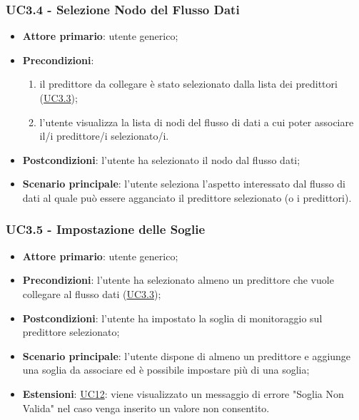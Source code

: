 	\label{par:UC3.4}
	\subsubsection{UC3.4 - Selezione Nodo del Flusso Dati}
		\begin{itemize}
			\item\textbf{Attore primario}: utente generico;
			\item\textbf{Precondizioni}:
				\begin{enumerate}
					\item il predittore da collegare è stato selezionato dalla lista dei predittori (\hyperref[par:UC3.3]{UC3.3});
					\item l’utente visualizza la lista di nodi del flusso di dati a cui poter associare il/i predittore/i selezionato/i.
				\end{enumerate}
			\item\textbf{Postcondizioni}: l'utente ha selezionato il nodo dal flusso dati;
			\item\textbf{Scenario principale}: l’utente seleziona l’aspetto interessato dal flusso di dati al quale può essere agganciato il predittore selezionato (o i predittori).
		\end{itemize}

	\label{par:UC3.5}
	\subsubsection{UC3.5 - Impostazione delle Soglie}
		\begin{itemize}
			\item\textbf{Attore primario}: utente generico;
			\item\textbf{Precondizioni}: l'utente ha selezionato almeno un predittore che vuole collegare al flusso dati (\hyperref[par:UC3.3]{UC3.3});
			\item\textbf{Postcondizioni}: l’utente ha impostato la soglia di monitoraggio sul predittore selezionato;
			\item\textbf{Scenario principale}: l’utente dispone di almeno un predittore e aggiunge una soglia da associare ed è possibile impostare più di una soglia;
			\item\textbf{Estensioni}: \hyperref[par:UC12]{UC12}: viene visualizzato un messaggio di errore "Soglia Non Valida" nel caso venga inserito un valore non consentito.
		\end{itemize}

	\label{par:UC3.6}
